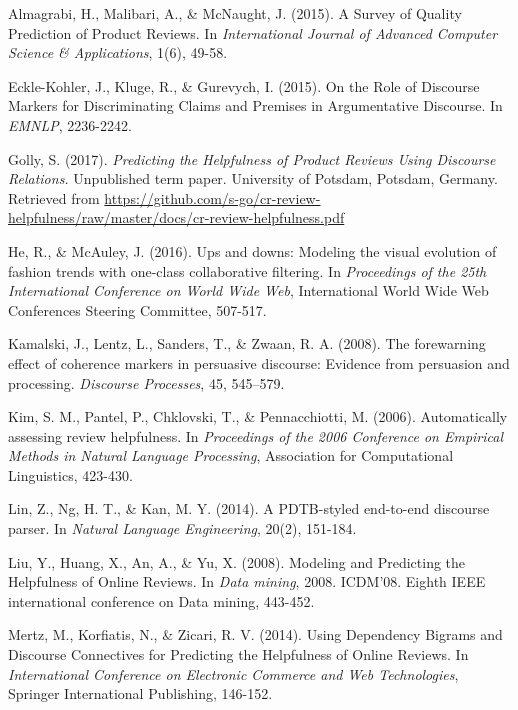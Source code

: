 \documentclass[
    a4paper,%
    12pt,%
    oneside,%
    toc=bibliography,
    final,
]{scrartcl}
\begin{document}
\newpage
\begin{thebibliography}{9}

 Almagrabi, H., Malibari, A., \& McNaught, J. (2015). A Survey of Quality Prediction of Product Reviews. In \textit{International Journal of Advanced Computer Science \& Applications}, 1(6), 49-58.

 Eckle-Kohler, J., Kluge, R., \& Gurevych, I. (2015). On the Role of Discourse Markers for Discriminating Claims and Premises in Argumentative Discourse. In \textit{EMNLP}, 2236-2242.

 Golly, S. (2017). \textit{Predicting the Helpfulness of Product Reviews Using Discourse Relations.} Unpublished term paper. University of Potsdam, Potsdam, Germany. Retrieved from \url{https://github.com/s-go/cr-review-helpfulness/raw/master/docs/cr-review-helpfulness.pdf}

 He, R., \& McAuley, J. (2016). Ups and downs: Modeling the visual evolution of fashion trends with one-class collaborative filtering. In \textit{Proceedings of the 25th International Conference on World Wide Web}, International World Wide Web Conferences Steering Committee, 507-517.

 Kamalski, J., Lentz, L., Sanders, T., \& Zwaan, R. A. (2008). The forewarning effect of coherence markers in persuasive discourse: Evidence from persuasion and processing. \textit{Discourse Processes}, 45, 545–579.

 Kim, S. M., Pantel, P., Chklovski, T., \& Pennacchiotti, M. (2006). Automatically assessing review helpfulness. In \textit{Proceedings of the 2006 Conference on Empirical Methods in Natural Language Processing}, Association for Computational Linguistics, 423-430.

 Lin, Z., Ng, H. T., \& Kan, M. Y. (2014). A PDTB-styled end-to-end discourse parser. In \textit{Natural Language Engineering}, 20(2), 151-184.

 Liu, Y., Huang, X., An, A., \& Yu, X. (2008). Modeling and Predicting the Helpfulness of Online Reviews. In \textit{Data mining}, 2008. ICDM'08. Eighth IEEE international conference on Data mining, 443-452.

 Mertz, M., Korfiatis, N., \& Zicari, R. V. (2014). Using Dependency Bigrams and Discourse Connectives for Predicting the Helpfulness of Online Reviews. In \textit{International Conference on Electronic Commerce and Web Technologies}, Springer International Publishing, 146-152.


\end{thebibliography}
\end{document}
